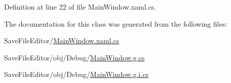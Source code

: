 Definition at line 22 of file Main\+Window.\+xaml.\+cs.



The documentation for this class was generated from the following files\+:\begin{DoxyCompactItemize}
\item 
Save\+File\+Editor/\hyperlink{_save_file_editor_2_main_window_8xaml_8cs}{Main\+Window.\+xaml.\+cs}\item 
Save\+File\+Editor/obj/\+Debug/\hyperlink{_save_file_editor_2obj_2_debug_2_main_window_8g_8cs}{Main\+Window.\+g.\+cs}\item 
Save\+File\+Editor/obj/\+Debug/\hyperlink{_save_file_editor_2obj_2_debug_2_main_window_8g_8i_8cs}{Main\+Window.\+g.\+i.\+cs}\end{DoxyCompactItemize}
